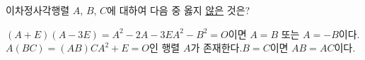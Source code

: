 이차정사각행렬 $A$, $B$, $C$에 대하여 다음 중 옳지 \underline{않은} 것은? 
\begin{choicesv}{$(A+E)(A-3E)=A^2-2A-3E$}{$A^2-B^2=O$이면 $A=B$ 또는 $A=-B$이다.}{$A(BC)=(AB)C$}{$A^2+E=O$인 행렬 $A$가 존재한다.}{$B=C$이면 $AB=AC$이다.}\end{choicesv}
